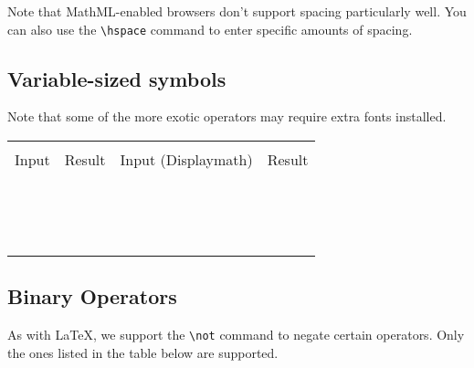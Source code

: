 Note that MathML-enabled browsers don't support spacing particularly well.
You can also use the \verb|\hspace| command to enter specific amounts of spacing.

\begin{demotable}
\end{demotable}

\subsection*{Variable-sized symbols}

Note that some of the more exotic operators may require extra fonts installed.

\newcommand{\dmdemo}[1]{\minout{#1} & \dminout{#1} \\}
\newcommand{\vdemo}[1]{\dmdemo{#1_a^b A_{\lambda}}}

\newenvironment{dmdemotable}
{\begin{center}
 \begin{tabular}{|r|l|r|l|}
 \hline \\
 Input & Result & Input (Displaymath) & Result \\
 \hline \\
}{\hline
 \end{tabular}
 \end{center}
}

\begin{dmdemotable}
\vdemo{\sum}
\vdemo{\prod}
\vdemo{\coprod}
\vdemo{\int}
\vdemo{\oint}
\vdemo{\bigcap}
\vdemo{\bigcup}
\vdemo{\bigsqcup}
\vdemo{\bigvee}
\vdemo{\bigwedge}
\vdemo{\bigodot}
\vdemo{\bigotimes}
\vdemo{\bigoplus}
\vdemo{\biguplus}
\end{dmdemotable}

\subsection*{Binary Operators}

As with LaTeX, we support the \verb|\not| command to negate certain operators. Only
the ones listed in the table below are supported.


\newcommand{\rdemo}[1]{\minout{#1} & & \\}
\newcommand{\rndemo}[1]{\minout{#1} & \minout{\not #1} \\}
\newenvironment{rdemotable}
{\begin{center}
 \begin{tabular}{|r|l|r|l|}
 \hline \\
 Input & Result & Input (notted) & Result \\
 \hline \\
}{\hline
 \end{tabular}
 \end{center}
}

